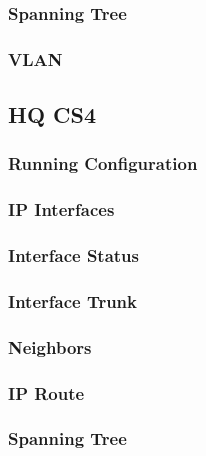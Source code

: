 \subsubsection{Spanning Tree}


\subsubsection{VLAN}






\subsection{HQ CS4}
\subsubsection{Running Configuration}


\subsubsection{IP Interfaces}


\subsubsection{Interface Status}


\subsubsection{Interface Trunk}


\subsubsection{Neighbors}


\subsubsection{IP Route}


\subsubsection{Spanning Tree}


